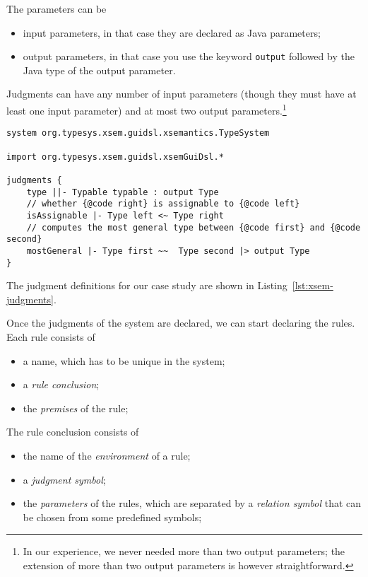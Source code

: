 \noindent
The parameters can be

\begin{itemize}
\item 
input parameters, in that case they are declared as Java parameters;
\item 
output parameters, in that case you use the keyword
\verb|output| followed by the Java
type of the output parameter.
\end{itemize}

Judgments can have any number of input parameters (though they must have at
least one input parameter) and at most two output parameters.\footnote{In our
experience, we never needed more than two output parameters; the extension of
more than two output parameters is however straightforward.}

\begin{lstlisting}[language=xsemantics,float,label=lst:xsem-judgments,caption=Judgment
definitions in Xsemantics]
system org.typesys.xsem.guidsl.xsemantics.TypeSystem

import org.typesys.xsem.guidsl.xsemGuiDsl.*

judgments {
	type ||- Typable typable : output Type
	// whether {@code right} is assignable to {@code left}
	isAssignable |- Type left <~ Type right
	// computes the most general type between {@code first} and {@code second}
	mostGeneral |- Type first ~~  Type second |> output Type
}
\end{lstlisting}

\noindent
The judgment definitions for our case study are shown in
Listing~\ref{lst:xsem-judgments}.

Once the judgments of the system are declared, we can start declaring the
rules.  Each rule consists of

\begin{itemize}
\item
a name, which has to be unique in the system;
\item
a \textit{rule conclusion};
\item
the \textit{premises} of the rule;
\end{itemize}

\noindent
The rule conclusion consists of

\begin{itemize}
\item
the name of the \textit{environment} of a rule;
\item
a \textit{judgment symbol};
\item
the \textit{parameters} of the rules, which are separated by
a \textit{relation symbol} that can be chosen from some predefined symbols;
\end{itemize}


